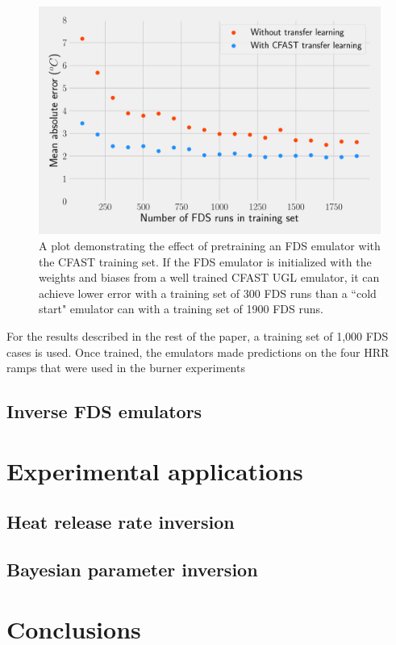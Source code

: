 \documentclass{article}
\begin{document}
\begin{figure}[htb] \centering
\includegraphics[width=.75\textwidth]{./figures/transfer_learning_effect.pdf}
\caption{A plot demonstrating the effect of pretraining an FDS emulator with the CFAST training set. If the FDS emulator is initialized with the weights and biases from a well trained CFAST UGL emulator, it can achieve lower error with a training set of 300 FDS runs than a ``cold start" emulator can with a training set of 1900 FDS runs.}
\label{fig:transfer_learning}
\end{figure}

For the results described in the rest of the paper, a training set of 1,000 FDS cases is used. Once trained, the emulators made predictions on the four HRR ramps that were used in the burner experiments 





\subsection{Inverse FDS emulators}
\section{Experimental applications}
\subsection{Heat release rate inversion}
\subsection{Bayesian parameter inversion}
\section{Conclusions}


\end{document}
